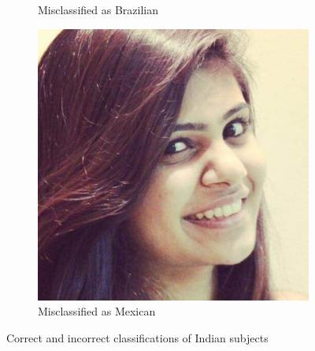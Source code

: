 \begin{figure}
\begin{subfigure}[b]{0.3\textwidth}
      \caption{Misclassified as Brazilian}
    \end{subfigure}
    \begin{subfigure}[b]{0.3\textwidth}
      \includegraphics[width=\textwidth]{figures/results/misclassification/india-mexico.jpg}
      \caption{Misclassified as Mexican}
    \end{subfigure}
\caption{Correct and incorrect classifications of Indian subjects}
\label{fig:results:dc:misclass:india}
\end{figure}

